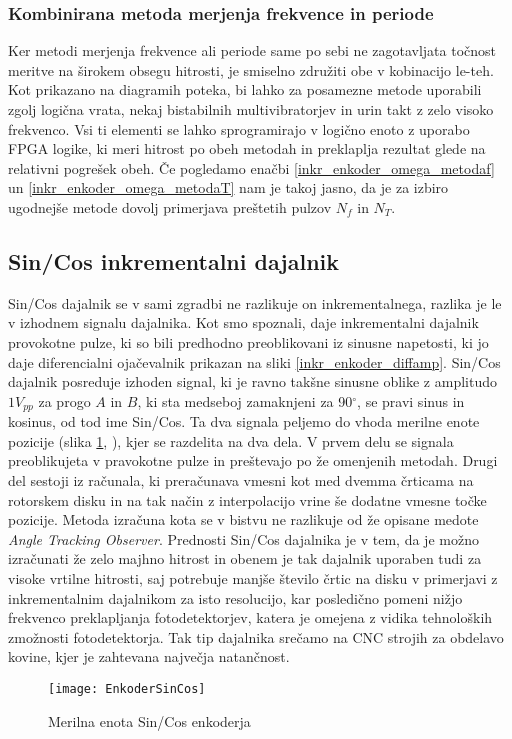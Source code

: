 \documentclass[a4paper,twoside,openright,12pt]{book}
\begin{document}
\subsubsection{Kombinirana metoda merjenja frekvence in periode}
Ker metodi merjenja frekvence ali periode same po sebi ne zagotavljata točnost meritve na širokem obsegu hitrosti, je smiselno združiti obe v kobinacijo le-teh. Kot prikazano na diagramih poteka, bi lahko za posamezne metode uporabili zgolj logična vrata, nekaj bistabilnih multivibratorjev in urin takt z zelo visoko frekvenco. Vsi ti elementi se lahko sprogramirajo v logično enoto z uporabo FPGA logike, ki meri hitrost po obeh metodah in preklaplja rezultat glede na relativni pogrešek obeh. Če pogledamo enačbi \ref{inkr_enkoder_omega_metodaf} un \ref{inkr_enkoder_omega_metodaT} nam je takoj jasno, da je za izbiro ugodnejše metode dovolj primerjava preštetih pulzov $N_f$ in $N_T$.
\subsection{Sin/Cos inkrementalni dajalnik }
Sin/Cos dajalnik se v sami zgradbi ne razlikuje on inkrementalnega, razlika je le v izhodnem signalu dajalnika. Kot smo spoznali, daje inkrementalni dajalnik provokotne pulze, ki so bili predhodno preoblikovani iz sinusne napetosti, ki jo daje diferencialni ojačevalnik prikazan na sliki \ref{inkr_enkoder_diffamp}. Sin/Cos dajalnik posreduje izhoden signal, ki je ravno takšne sinusne oblike z amplitudo $1V_{pp}$ za progo $A$ in $B$, ki sta medseboj zamaknjeni za 90$^\circ$, se pravi sinus in kosinus, od tod ime Sin/Cos. Ta dva signala peljemo do vhoda merilne enote pozicije (slika \ref{EnkoderSinCos}, \cite{schmirgel2009fpga}), kjer se razdelita na dva dela. V prvem delu se signala preoblikujeta v pravokotne pulze in preštevajo po že omenjenih metodah. Drugi del sestoji iz računala, ki preračunava vmesni kot med dvemma črticama na rotorskem disku in na tak način z interpolacijo vrine še dodatne vmesne točke pozicije. Metoda izračuna kota se v bistvu ne razlikuje od že opisane medote  \textit{Angle Tracking Observer}. Prednosti Sin/Cos dajalnika je v tem, da je možno izračunati že zelo majhno hitrost in obenem je tak dajalnik uporaben tudi za visoke vrtilne hitrosti, saj potrebuje manjše število črtic na disku v primerjavi z inkrementalnim dajalnikom za isto resolucijo, kar posledično pomeni nižjo frekvenco preklapljanja fotodetektorjev, katera je omejena z vidika tehnoloških zmožnosti fotodetektorja. Tak tip dajalnika srečamo na CNC strojih za obdelavo kovine, kjer je zahtevana največja natančnost.
\begin{figure}[h]
	\centering
	\texttt{[image: EnkoderSinCos]}
	\caption{\label{EnkoderSinCos} Merilna enota Sin/Cos enkoderja }
\end{figure}
\end{document}
